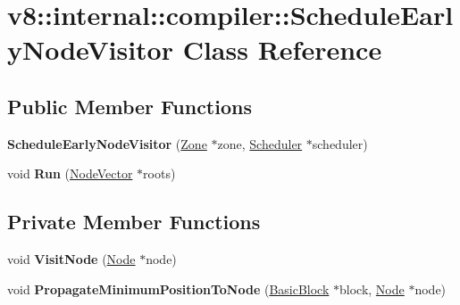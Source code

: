 \hypertarget{classv8_1_1internal_1_1compiler_1_1_schedule_early_node_visitor}{}\section{v8\+:\+:internal\+:\+:compiler\+:\+:Schedule\+Early\+Node\+Visitor Class Reference}
\label{classv8_1_1internal_1_1compiler_1_1_schedule_early_node_visitor}
\subsection*{Public Member Functions}
\begin{DoxyCompactItemize}
\item 
{\bfseries Schedule\+Early\+Node\+Visitor} (\hyperlink{classv8_1_1internal_1_1_zone}{Zone} $\ast$zone, \hyperlink{classv8_1_1internal_1_1compiler_1_1_scheduler}{Scheduler} $\ast$scheduler)\hypertarget{classv8_1_1internal_1_1compiler_1_1_schedule_early_node_visitor_a8f23b73985f857c5c15491ec49b807a2}{}\label{classv8_1_1internal_1_1compiler_1_1_schedule_early_node_visitor_a8f23b73985f857c5c15491ec49b807a2}

\item 
void {\bfseries Run} (\hyperlink{classv8_1_1internal_1_1_zone_vector}{Node\+Vector} $\ast$roots)\hypertarget{classv8_1_1internal_1_1compiler_1_1_schedule_early_node_visitor_a5929040cda694a3b3a3ec4bef0894bcf}{}\label{classv8_1_1internal_1_1compiler_1_1_schedule_early_node_visitor_a5929040cda694a3b3a3ec4bef0894bcf}

\end{DoxyCompactItemize}
\subsection*{Private Member Functions}
\begin{DoxyCompactItemize}
\item 
void {\bfseries Visit\+Node} (\hyperlink{classv8_1_1internal_1_1compiler_1_1_node}{Node} $\ast$node)\hypertarget{classv8_1_1internal_1_1compiler_1_1_schedule_early_node_visitor_a1a4535953e508adb3bb2fc36e749c123}{}\label{classv8_1_1internal_1_1compiler_1_1_schedule_early_node_visitor_a1a4535953e508adb3bb2fc36e749c123}

\item 
void {\bfseries Propagate\+Minimum\+Position\+To\+Node} (\hyperlink{classv8_1_1internal_1_1compiler_1_1_basic_block}{Basic\+Block} $\ast$block, \hyperlink{classv8_1_1internal_1_1compiler_1_1_node}{Node} $\ast$node)\hypertarget{classv8_1_1internal_1_1compiler_1_1_schedule_early_node_visitor_a9fd8435e63d6aedfbcba2c40844cb69e}{}\label{classv8_1_1internal_1_1compiler_1_1_schedule_early_node_visitor_a9fd8435e63d6aedfbcba2c40844cb69e}

\end{DoxyCompactItemize}
